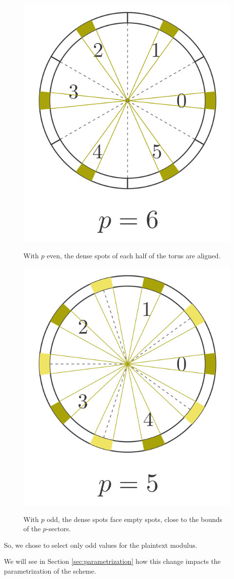 \begin{figure}
	\begin{minipage}{0.49\linewidth}
		\    \centering
		\includegraphics[width=0.5\linewidth]{img/to_harmonize/torus_p_even.png}
		\caption{With $p$ even, the dense spots of each half of the torus are aligned.}
		\label{fig:torus_p_even}
	\end{minipage}\hspace{1em}%
	\begin{minipage}{0.49\linewidth}
		\centering
		\includegraphics[width=0.5\linewidth]{img/to_harmonize/torus_p_odd.png}
		\caption{With $p$ odd, the dense spots face empty spots, close to the bounds of the $p$-sectors.}
	\end{minipage}
	\caption{}
	\label{fig:torus_p_even_vs_odd}
\end{figure}



So, we chose to select only odd values for the plaintext modulus. 

We will see in Section \ref{sec:parametrization} how this change impacts the parametrization of the scheme.



